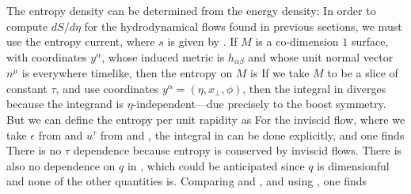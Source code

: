 \documentclass[12pt]{article}
\begin{document}
The entropy density can be determined from the energy density:
In order to compute $dS/d\eta$ for the hydrodynamical flows found in previous sections, we must use the entropy current,
where $s$ is given by .  If $M$ is a co-dimension $1$ surface, with coordinates $y^\alpha$, whose induced metric is $h_{\alpha\beta}$ and whose unit normal vector $n^\mu$ is everywhere timelike, then the entropy on $M$ is
If we take $M$ to be a slice of constant $\tau$, and use coordinates $y^\alpha = (\eta,x_\perp,\phi)$, then the integral in  diverges because the integrand is $\eta$-independent---due precisely to the boost symmetry.  But we can define the entropy per unit rapidity as
For the inviscid flow, where we take $\epsilon$ from  and $u^\tau$ from  and , the integral in  can be done explicitly, and one finds
There is no $\tau$ dependence because entropy is conserved by inviscid flows.  There is also no dependence on $q$ in , which could be anticipated since $q$ is dimensionful and none of the other quantities is.  Comparing  and , and using , one finds
\end{document}
